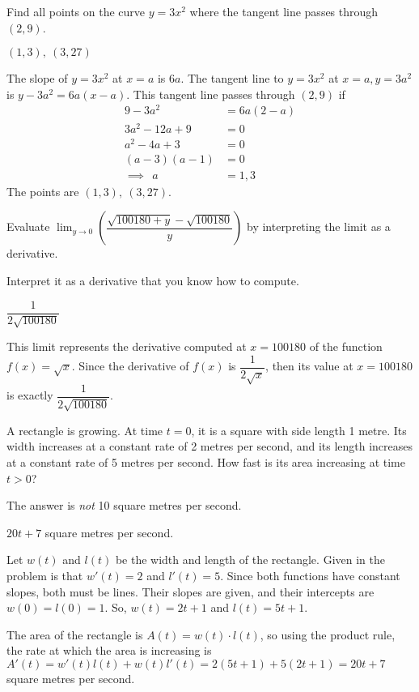 \begin{question}[1997D]Find all points on the curve $y=3x^2$ where the tangent
line passes through $(2,9)$.
\end{question}
\begin{answer}{$(1,3),\ (3,27)$}
\end{answer}
\begin{solution}
The slope of $y=3x^2$ at $x=a$ is $6a$. The tangent line to
$y=3x^2$ at $x=a, y=3a^2$ is $y-3a^2=6a(x-a)$. This tangent line passes
through $(2,9)$ if
\begin{align*}
9-3a^2&=6a(2-a)\\
 3a^2-12a+9&=0\\
  a^2-4a+3&=0\\
  (a-3)(a-1)&=0\\
\implies~~a&=1,3
\end{align*}
The points are {$(1,3),\ (3,27)$}.
\end{solution}

\begin{Mquestion}[2015Q]
Evaluate $\displaystyle \lim_{y\rightarrow 0}\left(
\dfrac{\sqrt{100180+y}-\sqrt{100180}}{y}\right)$ by interpreting the limit as a derivative.
\end{Mquestion}
\begin{hint} Interpret it as a derivative that you know how to compute.
\end{hint}
\begin{answer} $\dfrac{1}{2\sqrt{100180}}$
\end{answer}
\begin{solution} This limit represents the derivative computed at $x=100180$ of the function
$f(x)=\sqrt{x}$. Since the derivative of $f(x)$ is $\dfrac{1}{2\sqrt{x}}$, then
its value at $x=100180$ is exactly $\dfrac{1}{2\sqrt{100180}}$.
\end{solution}


\begin{Mquestion}
A rectangle is growing. At time $t=0$, it is a square with
           side length 1 metre. Its width increases at a constant rate
           of 2 metres per second, and its length increases at a constant
           rate of 5 metres per second. How fast is its area increasing
           at time $t>0$?\end{Mquestion}
\begin{hint} The answer is \emph{not} 10 square metres per second.
\end{hint}
\begin{answer} $20t+7$ square metres per second.
\end{answer}
\begin{solution} Let $w(t)$ and $l(t)$ be the width and length of the rectangle. Given in the problem is that $w'(t)=2$ and $l'(t)=5$. Since both functions have constant slopes, both must be lines. Their slopes are given, and their intercepts are $w(0)=l(0)=1$. So, $w(t)=2t+1$ and $l(t)=5t+1$.

The area of the rectangle is $A(t)=w(t)\cdot l(t)$, so using the product rule, the rate at which the area is increasing is $A'(t)=w'(t)l(t)+w(t)l'(t)=2(5t+1)+5(2t+1)=20t+7$ square metres per second.
\end{solution}



